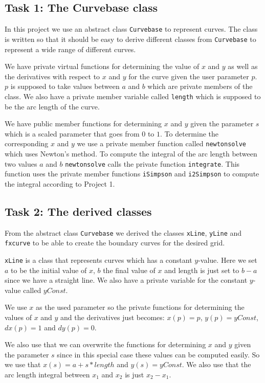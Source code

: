 \documentclass[a4paper,10pt]{article}
\begin{document}
\FloatBarrier

\subsection*{Task 1: The Curvebase class}
In this project we use an abstract class \texttt{Curvebase} to represent curves. The class is written so that it should be easy to derive different classes from \texttt{Curvebase} to represent a wide range of different curves.

We have private virtual functions for determining the value of $x$ and $y$ as well as the derivatives with respect to $x$ and $y$ for the curve given the user parameter $p$. $p$ is supposed to take values between $a$ and $b$ which are private members of the class. We also have a private member variable called \texttt{length} which is supposed to be the arc length of the curve. 

We have public member functions for determining $x$ and $y$ given the parameter $s$ which is a scaled parameter that goes from $0$ to $1$. To determine the corresponding $x$ and $y$ we use a private member function called \texttt{newtonsolve} which uses Newton's method. To compute the integral of the arc length between two values $a$ and $b$ \texttt{newtonsolve} calls the private function \texttt{integrate}. This function uses the private member functions \texttt{iSimpson} and \texttt{i2Simpson} to compute the integral according to Project 1. 

\subsection*{Task 2: The derived classes}
From the abstract class \texttt{Curvebase} we derived the classes \texttt{xLine}, \texttt{yLine} and \texttt{fxcurve} to be able to create the boundary curves for the desired grid.

\texttt{xLine} is a class that represents curves which has a constant $y$-value. Here we set $a$ to be the initial value of $x$, $b$ the final value of $x$ and length is just set to $b-a$ since we have a straight line. We also have a private variable for the constant $y$-value called $yConst$.

We use $x$ as the used parameter so the private functions for determining the values of $x$ and $y$ and the derivatives just becomes: $x(p)=p$, $y(p)=yConst$, $dx(p)=1$ and $dy(p)=0$.

We also use that we can overwrite the functions for determining $x$ and $y$ given the parameter $s$ since in this special case these values can be computed easily. So we use that $x(s) = a+s*length$ and $y(s) = yConst$. We also use that the arc length integral between $x_1$ and $x_2$ is just $x_2-x_1$.
\end{document}
